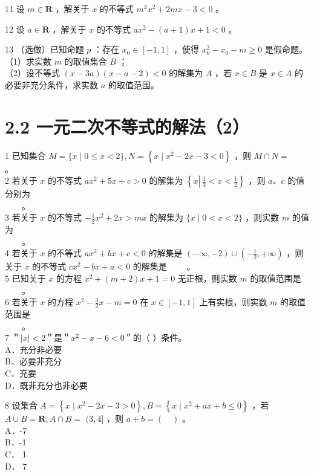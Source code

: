 \documentclass[10pt]{article}
\begin{document}
11 设 \(m \in \mathbf{R}\) ，解关于 \(x\) 的不等式 \(m^{2} x^{2}+2 m x-3<0\) 。

12 设 \(a \in \mathbf{R}\) ，解关于 \(x\) 的不等式 \(a x^{2}-(a+1) x+1<0\) 。

13 （选做）已知命题 \(p\) ：存在 \(x_{0} \in[-1,1]\) ，使得 \(x_{0}^{2}-x_{0}-m \geqslant 0\) 是假命题。\\
（1）求实数 \(m\) 的取值集合 \(B\) ；\\
（2）设不等式 \((x-3 a)(x-a-2)<0\) 的解集为 \(A\) ，若 \(x \in B\) 是 \(x \in A\) 的必要非充分条件，求实数 \(a\) 的取值范围。

\section*{2.2 一元二次不等式的解法（2）}
1 已知集合 \(M=\{x \mid 0 \leqslant x<2\}, N=\left\{x \mid x^{2}-2 x-3<0\right\}\) ，则 \(M \cap N=\) \(\qquad\)。\\
2 若关于 \(x\) 的不等式 \(a x^{2}+5 x+c>0\) 的解集为 \(\left\{x \left\lvert\, \frac{1}{3}<x<\frac{1}{2}\right.\right\}\) ，则 \(a 、 c\) 的值分别为\\
\(\qquad\)。\\
3 若关于 \(x\) 的不等式 \(-\frac{1}{2} x^{2}+2 x>m x\) 的解集为 \(\{x \mid 0<x<2\}\) ，则实数 \(m\) 的值为\\
\(\qquad\)。\\
4 若关于 \(x\) 的不等式 \(a x^{2}+b x+c<0\) 的解集是 \((-\infty,-2) \cup\left(-\frac{1}{2},+\infty\right)\) ，则关于 \(x\) 的不等式 \(c x^{2}-b x+a<0\) 的解集是 \(\qquad\)。\\
5 已知关于 \(x\) 的方程 \(x^{2}+(m+2) x+1=0\) 无正根，则实数 \(m\) 的取值范围是 \(\qquad\)。\\
6 若关于 \(x\) 的方程 \(x^{2}-\frac{3}{2} x-m=0\) 在 \(x \in[-1,1]\) 上有实根，则实数 \(m\) 的取值范围是\\
\(\qquad\)。\\
7 ＂\(|x|<2\)＂是＂\(x^{2}-x-6<0\)＂的（ ）条件。\\
A．充分非必要\\
B．必要非充分\\
C．充要\\
D．既非充分也非必要

8 设集合 \(A=\left\{x \mid x^{2}-2 x-3>0\right\}, B=\left\{x \mid x^{2}+a x+b \leqslant 0\right\}\) ，若 \(A \cup B=\mathbf{R}, A \cap B=\) \((3,4]\) ，则 \(a+b=(\quad)\) 。\\
A．-7\\
B．-1\\
C． 1\\
D． 7
\end{document}
